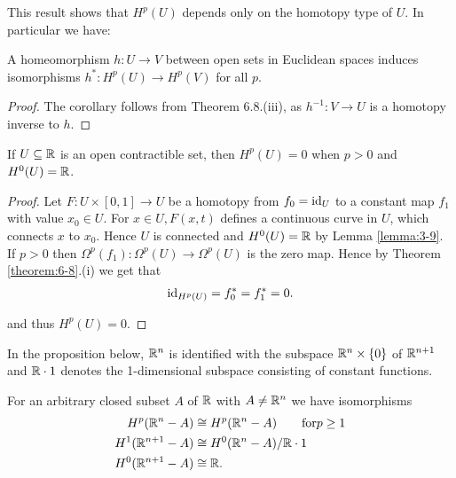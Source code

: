 This result shows that $H^p(U)$ depends only on the homotopy type of $U$. In
particular we have:

\begin{corollary}\label{corollary:6-9}
A homeomorphism $h:U\to V$ between open sets in Euclidean spaces induces isomorphisms $h^*:H^p(U)\to H^p(V)$ for
all $p$.
\end{corollary}

\begin{proof}
  The corollary follows from Theorem 6.8.(iii), as $h^{-1}:V\to U$ is a
homotopy inverse to $h$.
\end{proof}

\begin{corollary}\label{corollary:6-10}
If $U\subseteq \mathbb{R}$ is an open contractible set, then $H^p(U) = 0$ when
$p > 0$ and $H^0(U) = \mathbb{R}$.
\end{corollary}


\begin{proof}
Let $F:U\times[0, 1]\to U$ be a homotopy from $f_0 =\operatorname{id}_U$ to a constant map
$f_1$ with value $x_0\in U$. For $x\in U, F(x, t)$ defines a continuous curve in $U$,
which connects $x$ to $x_0$. Hence $U$ is connected and $H^0(U) = \mathbb{R}$ by Lemma \ref{lemma:3-9}.
If $p > 0$ then $\Omega^p(f_1):\Omega^p(U)\to\Omega^p(U)$ is the zero map. Hence by Theorem
\ref{theorem:6-8}.(i) we get that
\begin{align*}
  \operatorname{id}_{H^p(U)} = f_0^* = f_1^* = 0.
\end{align*}

and thus $H^p(U) = 0$.
\end{proof}

In the proposition below, $\mathbb{R}^n$ is identified with the subspace $\mathbb{R}^n\times\{0\}$ of $\mathbb{R}^{n+1}$
and $\mathbb{R}\cdot 1$ denotes the 1-dimensional subspace consisting of constant functions.

\begin{proposition}\label{proposition:6-11}
  For an arbitrary closed subset $A$ of $\mathbb{R}$ with $A\neq\mathbb{R}^n$ we have isomorphisms
  \begin{align*}
    H^p(\mathbb{R}^n - A) &\cong H^p(\mathbb{R}^n - A)\qquad\text{for} p\ge 1 \\
    H^1(\mathbb{R}^{n+1} - A) &\cong H^0(\mathbb{R}^n - A)/\mathbb{R}\cdot 1 \\
    H^0(\mathbb{R}^{n+1} - A) &\cong \mathbb{R}.
  \end{align*}
\end{proposition}


